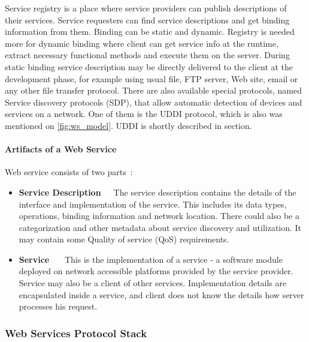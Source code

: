 Service registry is a place where service providers can publish
descriptions of their services. Service requesters can find service descriptions
and get binding information from them. Binding can be static and dynamic.
Registry is needed more for dynamic binding where client can get service info at
the runtime, extract necessary functional methods and execute them on the
server. During static binding service description may be directly delivered to
the client at the development phase, for example using usual file, FTP
server, Web site, email or any other file transfer protocol.
There are also available special protocols, named Service discovery protocols
(SDP), that allow automatic detection of devices and services on a network. One
of them is the \gls{UDDI} protocol, which is also was mentioned on
\autoref{fig:ws_model}. UDDI is shortly described in
 section.

\paragraph{\textbf{Artifacts of a Web Service}}
\newline
Web service consists of two parts~\cite{Kreger2001-WSC}:
\begin{itemize} 
\item \label{itm:service_description_artifact} 
\textbf{Service Description}~~~The
service description contains the details of the interface and implementation of the service. This includes its data types, operations, binding
information and network location. There could also be a categorization and
other metadata about service discovery and utilization. It may contain some
Quality of service (QoS) requirements. 

 \item \textbf{Service}
 ~~~This is the implementation of a service - a software module deployed on network accessible platforms provided by the service provider.
 Service may also be a client of other services. Implementation details
 are encapsulated inside a service, and client does not know the details how
 server processes his request.
\end{itemize}



\subsubsection{Web Services Protocol Stack}
\label{sec:ws_protocol_stack}

